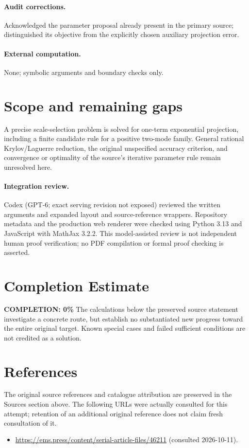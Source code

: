 \documentclass[11pt]{article}
\begin{document}
\paragraph{Audit corrections.} Acknowledged the parameter proposal already present in the primary source; distinguished its objective from the explicitly chosen auxiliary projection error.
\paragraph{External computation.} None; symbolic arguments and boundary checks only.
\section{Scope and remaining gaps}
A precise scale-selection problem is solved for one-term exponential projection, including a finite candidate rule for a positive two-mode family. General rational Krylov/Laguerre reduction, the original unspecified accuracy criterion, and convergence or optimality of the source's iterative parameter rule remain unresolved here.
\paragraph{Integration review.} Codex (GPT-6; exact serving revision not exposed) reviewed the written arguments and expanded layout and source-reference wrappers. Repository metadata and the production web renderer were checked using Python 3.13 and JavaScript with MathJax 3.2.2. This model-assisted review is not independent human proof verification; no PDF compilation or formal proof checking is asserted.

\section{Completion Estimate}
\noindent\textbf{COMPLETION: 0\%}
The calculations below the preserved source statement investigate a concrete route,
but establish no substantiated new progress toward the entire original target.
Known special cases and failed sufficient conditions are not credited as a solution.
\section{References}
The original source references and catalogue attribution are preserved in the
Sources section above. The following URLs were actually consulted for this attempt;
retention of an additional original reference does not claim fresh consultation of it.
\begin{itemize}
\item \url{https://ems.press/content/serial-article-files/46211} (consulted 2026-10-11). 
\end{itemize}
\end{document}
